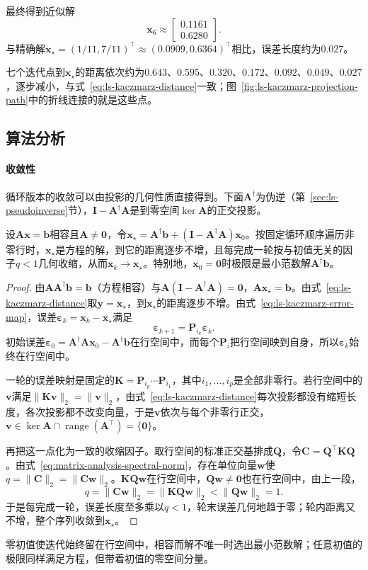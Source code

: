 最终得到近似解
\[
 \bm x_6\approx\begin{bmatrix}0.1161\\0.6280\end{bmatrix}.
\]
与精确解$\bm x_\star=(1/11,7/11)^\top\approx(0.0909,0.6364)^\top$相比，误差长度约为$0.027$。

七个迭代点到$\bm x_\star$的距离依次约为$0.643$、$0.595$、$0.320$、$0.172$、$0.092$、$0.049$、$0.027$，逐步减小，与式~\eqref{eq:ls-kaczmarz-distance}一致；图~\ref{fig:ls-kaczmarz-projection-path}中的折线连接的就是这些点。

\subsection{算法分析}

\paragraph{收敛性}
循环版本的收敛可以由投影的几何性质直接得到。下面$\bm A^\dagger$为伪逆（第~\ref{sec:ls-pseudoinverse}节），$\bm I-\bm A^\dagger\bm A$是到零空间$\ker\bm A$的正交投影。
\begin{theorem}[相容方程上循环Kaczmarz的收敛]
\label{thm:ls-kaczmarz-convergence}
设$\bm A\bm x=\bm b$相容且$\bm A\neq\bm 0$，令$\bm x_\star=\bm A^\dagger\bm b+(\bm I-\bm A^\dagger\bm A)\bm x_0$。按固定循环顺序遍历非零行时，$\bm x_\star$是方程的解，到它的距离逐步不增，且每完成一轮按与初值无关的因子$q<1$几何收缩，从而$\bm x_k\to\bm x_\star$。特别地，$\bm x_0=\bm 0$时极限是最小范数解$\bm A^\dagger\bm b$。
\end{theorem}
\begin{proof}
由$\bm A\bm A^\dagger\bm b=\bm b$（方程相容）与$\bm A(\bm I-\bm A^\dagger\bm A)=\bm0$，$\bm A\bm x_\star=\bm b$。由式~\eqref{eq:ls-kaczmarz-distance}取$\bm y=\bm x_\star$，到$\bm x_\star$的距离逐步不增。由式~\eqref{eq:ls-kaczmarz-error-map}，误差$\bm\varepsilon_k=\bm x_k-\bm x_\star$满足
\[
 \bm\varepsilon_{k+1}=\bm P_{i_k}\bm\varepsilon_k .
\]
初始误差$\bm\varepsilon_0=\bm A^\dagger\bm A\bm x_0-\bm A^\dagger\bm b$在行空间中，而每个$\bm P_i$把行空间映到自身，所以$\bm\varepsilon_k$始终在行空间中。

一轮的误差映射是固定的$\bm K=\bm P_{i_p}\cdots\bm P_{i_1}$，其中$i_1,\ldots,i_p$是全部非零行。若行空间中的$\bm v$满足$\lVert\bm K\bm v\rVert_2=\lVert\bm v\rVert_2$，由式~\eqref{eq:ls-kaczmarz-distance}每次投影都没有缩短长度，各次投影都不改变向量，于是$\bm v$依次与每个非零行正交，$\bm v\in\ker\bm A\cap\operatorname{range}(\bm A^\top)=\{\bm 0\}$。

再把这一点化为一致的收缩因子。取行空间的标准正交基排成$\bm Q$，令$\bm C=\bm Q^\top\bm K\bm Q$。由式~\eqref{eq:matrix-analysis-spectral-norm}，存在单位向量$\bm w$使$q=\lVert\bm C\rVert_2=\lVert\bm C\bm w\rVert_2$。$\bm K\bm Q\bm w$在行空间中，$\bm Q\bm w\neq\bm0$也在行空间中，由上一段，
\[
 q=\lVert\bm C\bm w\rVert_2=\lVert\bm K\bm Q\bm w\rVert_2<\lVert\bm Q\bm w\rVert_2=1 .
\]
于是每完成一轮，误差长度至多乘以$q<1$，轮末误差几何地趋于零；轮内距离又不增，整个序列收敛到$\bm x_\star$。
\end{proof}
零初值使迭代始终留在行空间中，相容而解不唯一时选出最小范数解；任意初值的极限同样满足方程，但带着初值的零空间分量。

